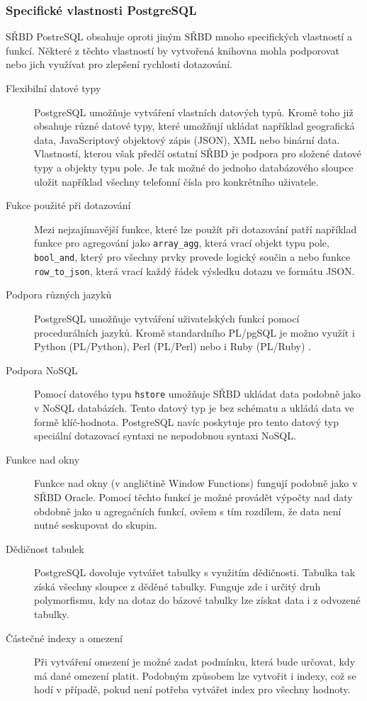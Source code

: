 \documentclass[ing,male,java,dept456]{diploma}						%
\begin{document}
\subsubsection{Specifické vlastnosti PostgreSQL}
\label{subsubsec:PostgreSQL}

SŘBD PostreSQL obsahuje oproti jiným SŘBD mnoho specifických vlastností a funkcí. Některé z těchto vlastností by vytvořená knihovna mohla podporovat nebo jich využívat pro zlepšení rychlosti dotazování.

\begin{description}
  \item[Flexibilní datové typy] PostgreSQL umožňuje vytváření vlastních datových typů. Kromě toho již obsahuje různé datové typy, které umožňují ukládat například geografická data, JavaScriptový objektový zápis (JSON), XML nebo binární data. Vlastností, kterou však předčí ostatní SŘBD je podpora pro složené datové typy a objekty typu pole. Je tak možné do jednoho databázového sloupce uložit například všechny telefonní čísla pro konkrétního uživatele.
  \item[Fukce použité při dotazování] Mezi nejzajímavější funkce, které lze použít při dotazování patří například funkce pro agregování jako \lstinline[style=inlinepython]|array_agg|, která vrací objekt typu pole, \lstinline[style=inlinepython]|bool_and|, který pro všechny prvky provede logický součin a nebo funkce \lstinline[style=inlinepython]|row_to_json|, která vrací každý řádek výsledku dotazu ve formátu JSON.
  \item[Podpora různých jazyků] PostgreSQL umožňuje vytváření uživatelských funkcí pomocí procedurálních jazyků. Kromě standardního PL/pgSQL je možno využít i Python (PL/Python), Perl (PL/Perl) nebo i Ruby (PL/Ruby) \cite{pllanguages}. 
  \item[Podpora NoSQL] Pomocí datového typu \lstinline[style=inlinepython]|hstore| umožňuje SŘBD ukládat data podobně jako v NoSQL databázích. Tento datový typ je bez schématu a ukládá data ve formě klíč-hodnota. PostgreSQL navíc poskytuje pro tento datový typ speciální dotazovací syntaxi ne nepodobnou syntaxi NoSQL.
  \item[Funkce nad okny] Funkce nad okny (v angličtině Window Functions) fungují podobně jako v SŘBD Oracle. Pomocí těchto funkcí je možné provádět výpočty nad daty obdobně jako u agregačních funkcí, ovšem s tím rozdílem, že data není nutné seskupovat do skupin.
  \item[Dědičnost tabulek] PostgreSQL dovoluje vytvářet tabulky s využitím dědičnosti. Tabulka tak získá všechny sloupce z děděné tabulky. Funguje zde i určitý druh polymorfismu, kdy na dotaz do bázové tabulky lze získat data i z odvozené tabulky.
  \item[Částečné indexy a omezení] Při vytváření omezení je možné zadat podmínku, která bude určovat, kdy má dané omezení platit. Podobným způsobem lze vytvořit i indexy, což se hodí v případě, pokud není potřeba vytvářet index pro všechny hodnoty.
\end{description}
\end{document}

